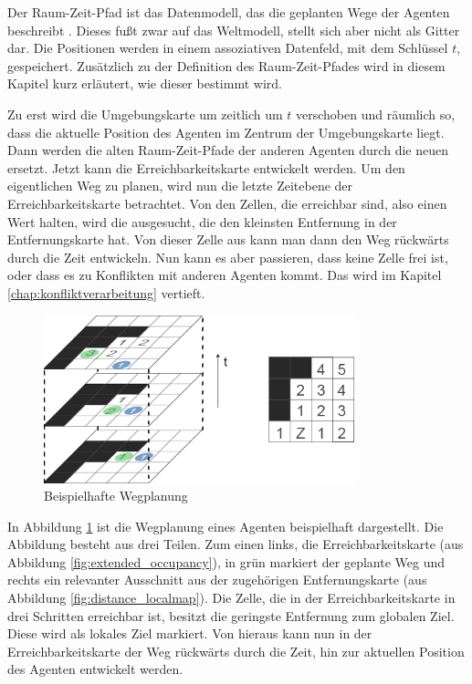 Der Raum-Zeit-Pfad ist das Datenmodell, das die geplanten Wege der Agenten beschreibt \cite{book:regele}. Dieses fußt zwar auf das Weltmodell, stellt sich aber nicht als Gitter dar. Die Positionen werden in einem assoziativen Datenfeld, mit dem Schlüssel \(t\), gespeichert. Zusätzlich zu der Definition des Raum-Zeit-Pfades wird in diesem Kapitel kurz erläutert, wie dieser bestimmt wird.

Zu erst wird die Umgebungskarte um zeitlich um \(t\) verschoben und räumlich so, dass die aktuelle Position des Agenten im Zentrum der Umgebungskarte liegt. Dann werden die alten Raum-Zeit-Pfade der anderen Agenten durch die neuen ersetzt. Jetzt kann die Erreichbarkeitskarte entwickelt werden. Um den eigentlichen Weg zu planen, wird nun die letzte Zeitebene der Erreichbarkeitskarte betrachtet. Von den Zellen, die erreichbar sind, also einen Wert halten, wird die ausgesucht, die den kleinsten Entfernung in der Entfernungskarte hat. Von dieser Zelle aus kann man dann den Weg rückwärts durch die Zeit entwickeln. \cite{book:regele}\newline
Nun kann es aber passieren, dass keine Zelle frei ist, oder dass es zu Konflikten mit anderen Agenten kommt. Das wird im Kapitel \ref{chap:konfliktverarbeitung} vertieft.
\begin{figure}[H]
    \includegraphics[width=9cm]{images/example_path_planning.png}
    \centering
    \caption{Beispielhafte Wegplanung}
    \label{fig:example_path_planning}
\end{figure}
In Abbildung \ref{fig:example_path_planning} ist die Wegplanung eines Agenten beispielhaft dargestellt. Die Abbildung besteht aus drei Teilen. Zum einen links, die Erreichbarkeitskarte (aus Abbildung \ref{fig:extended_occupancy}), in grün markiert der geplante Weg und rechts ein relevanter Ausschnitt aus der zugehörigen Entfernungskarte (aus Abbildung \ref{fig:distance_localmap}). Die Zelle, die in der Erreichbarkeitskarte in drei Schritten erreichbar ist, besitzt die geringste Entfernung zum globalen Ziel. Diese wird als lokales Ziel markiert. Von hieraus kann nun in der Erreichbarkeitskarte der Weg rückwärts durch die Zeit, hin zur aktuellen Position des Agenten entwickelt werden.
